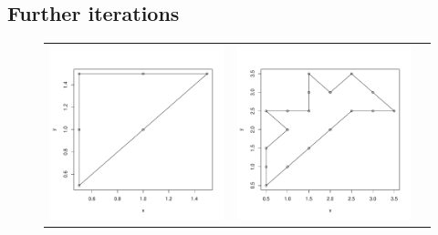 \subsection{Further iterations}
\begin{figure}[t]
\begin{center}
\begin{tabular}{ccc}
\includegraphics[scale=0.25]{fig/it2.pdf} &
\includegraphics[scale=0.25]{fig/it4.pdf} \\

\end{tabular}
\end{center}
\end{figure}
